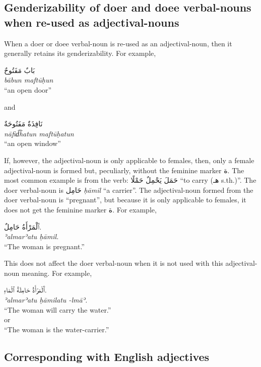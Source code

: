 \documentclass[
  10pt,
]{book}
\begin{document}
\subsection{Genderizability of doer and doee verbal-nouns when re-used as adjectival-nouns}\label{genderizability-of-doer-and-doee-verbal-nouns-when-re-used-as-adjectival-nouns}

When a doer or doee verbal-noun is re-used as an adjectival-noun, then it generally retains its genderizability. For example,

\foreignlanguage{arabic}{بَابٌ مَفَتُوحٌ}\\
\emph{bābun maftūḥun}\\
\enquote{an open door}

and

\foreignlanguage{arabic}{نَافِذَةٌ مَفَتُوحَةٌ}\\
\emph{nāfid͡hatun maftūḥatun}\\
\enquote{an open window}

If, however, the adjectival-noun is only applicable to females, then, only a female adjectival-noun is formed but, peculiarly, without the feminine marker \foreignlanguage{arabic}{ة}. The most common example is from the verb:
\foreignlanguage{arabic}{حَمَلَ يَحْمِلٌ حَمْلًا} \enquote{to carry (\foreignlanguage{arabic}{هـ} s.th.)}. The doer verbal-noun is \foreignlanguage{arabic}{حَامِل} \emph{ḥāmil} \enquote{a carrier}. The adjectival-noun formed from the doer verbal-noun is \enquote{pregnant}, but because it is only applicable to females, it does not get the feminine marker \foreignlanguage{arabic}{ة}. For example,

\foreignlanguage{arabic}{ٱَلْمَرْأَةُ حَامِلٌ.}\\
\emph{ʾalmarʾatu ḥāmil.}\\
\enquote{The woman is pregnant.}

This does not affect the doer verbal-noun when it is not used with this adjectival-noun meaning. For example,

\foreignlanguage{arabic}{ٱَلْمَرْأَةُ حَامِلَةُ ٱلْمَاءِ.}\\
\emph{ʾalmarʾatu ḥāmilatu -lmāʾ.}\\
\enquote{The woman will carry the water.}\\
or\\
\enquote{The woman is the water-carrier.}

\subsection{Corresponding with English adjectives}\label{corresponding-with-english-adjectives}
\end{document}
